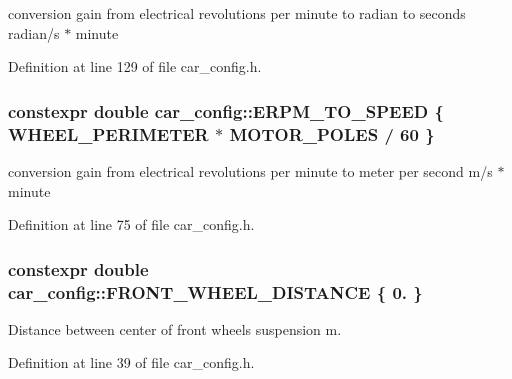 conversion gain from electrical revolutions per minute to radian to seconds  radian/s $\ast$ minute 



Definition at line 129 of file car\+\_\+config.\+h.

\subsubsection[{\texorpdfstring{E\+R\+P\+M\+\_\+\+T\+O\+\_\+\+S\+P\+E\+ED}{ERPM_TO_SPEED}}]{\setlength{\rightskip}{0pt plus 5cm}constexpr double car\+\_\+config\+::\+E\+R\+P\+M\+\_\+\+T\+O\+\_\+\+S\+P\+E\+ED \{ {\bf W\+H\+E\+E\+L\+\_\+\+P\+E\+R\+I\+M\+E\+T\+ER} $\ast$ {\bf M\+O\+T\+O\+R\+\_\+\+P\+O\+L\+ES} / 60 \}}\hypertarget{namespacecar__config_af33b95798967e7193927782fd91d36ce}{}\label{namespacecar__config_af33b95798967e7193927782fd91d36ce}


conversion gain from electrical revolutions per minute to meter per second  m/s $\ast$ minute 



Definition at line 75 of file car\+\_\+config.\+h.

\subsubsection[{\texorpdfstring{F\+R\+O\+N\+T\+\_\+\+W\+H\+E\+E\+L\+\_\+\+D\+I\+S\+T\+A\+N\+CE}{FRONT_WHEEL_DISTANCE}}]{\setlength{\rightskip}{0pt plus 5cm}constexpr double car\+\_\+config\+::\+F\+R\+O\+N\+T\+\_\+\+W\+H\+E\+E\+L\+\_\+\+D\+I\+S\+T\+A\+N\+CE \{ 0. \}}\hypertarget{namespacecar__config_a80d9d6f97a63ffcaba87b65a9e1e29e4}{}\label{namespacecar__config_a80d9d6f97a63ffcaba87b65a9e1e29e4}


Distance between center of front wheels suspension  m. 



Definition at line 39 of file car\+\_\+config.\+h.

